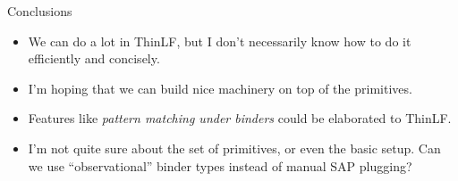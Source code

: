 \documentclass[dvipsnames,aspectratio=169]{beamer}
\theoremstyle{remark}
\begin{document}
\begin{frame}[fragile]{Conclusions}

\begin{itemize}
\item We can do a lot in ThinLF, but I don't necessarily know how to do it efficiently and concisely.
\item I'm hoping that we can build nice machinery on top of the primitives.
\item Features like \emph{pattern matching under binders} could be elaborated to ThinLF.
\item I'm not quite sure about the set of primitives, or even the basic setup. Can we use ``observational'' binder types instead of manual SAP plugging?






\end{itemize}


\end{frame}
\end{document}

